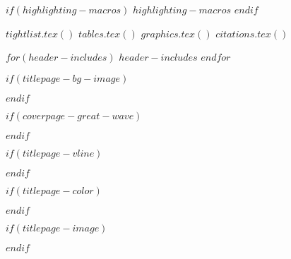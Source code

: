 $if(highlighting-macros)$
$highlighting-macros$
$endif$

$tightlist.tex()$
$tables.tex()$
$graphics.tex()$
$citations.tex()$

$for(header-includes)$
$header-includes$
$endfor$

\usepackage[utf8]{inputenc} %
\usepackage[T1]{fontenc} %
\usepackage{babel}
\usepackage{hyphenat}

$if(titlepage-bg-image)$
\usepackage{graphicx}
\usepackage{wallpaper} %
\usepackage{geometry}
$endif$

$if(coverpage-great-wave)$
\usepackage{graphicx}
\usepackage{geometry}
\usepackage{afterpage}
\usepackage{tikz}
\usetikzlibrary{fadings}
\usepackage[pagecolor=none]{pagecolor}
$endif$

$if(titlepage-vline)$
\usepackage{graphicx}
$endif$

$if(titlepage-color)$
\usepackage[pagecolor=none]{pagecolor}
$endif$

$if(titlepage-image)$
\usepackage{wallpaper} %
$endif$

